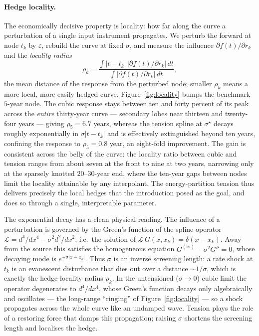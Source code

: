 \documentclass[]{interact}
\theoremstyle{plain}
\begin{document}
\paragraph{Hedge locality.} The economically decisive property is locality: how far along the
curve a perturbation of a single input instrument propagates. We perturb the forward at node
$t_k$ by $\varepsilon$, rebuild the curve at fixed $\sigma$, and measure the influence
$\partial f(t)/\partial r_k$ and the \emph{locality radius}
\begin{equation}
\rho_k=\frac{\int |t-t_k|\,\big|\partial f(t)/\partial r_k\big|\,dt}
{\int \big|\partial f(t)/\partial r_k\big|\,dt},
\label{eq:rho}
\end{equation}
the mean distance of the response from the perturbed node; smaller $\rho_k$ means a more local,
more easily hedged curve. Figure~\ref{fig:locality} bumps the benchmark $5$-year node. The
cubic response stays between ten and forty percent of its peak across the \emph{entire}
thirty-year curve --- secondary lobes near thirteen and twenty-four years --- giving
$\rho_5=6.7$ years, whereas the tension spline at $\sigma^\star$ decays roughly exponentially in
$\sigma|t-t_k|$ and is effectively extinguished beyond ten years, confining the response to
$\rho_5=0.8$ year, an eight-fold improvement. The gain is consistent across the belly of the
curve: the locality ratio between cubic and tension ranges from about seven at the front to
nine at two years, narrowing only at the sparsely knotted $20$--$30$-year end, where the
ten-year gaps between nodes limit the locality attainable by any interpolant. The
energy-partition tension thus delivers precisely the local hedges that the introduction posed
as the goal, and does so through a single, interpretable parameter.

The exponential decay has a clean physical reading. The influence of a perturbation is governed
by the Green's function of the spline operator $\mathcal{L}=d^4/dx^4-\sigma^2 d^2/dx^2$, i.e.\ the
solution of $\mathcal{L}\,G(x,x_k)=\delta(x-x_k)$. Away from the source this satisfies the
homogeneous equation $G^{(\mathrm{iv})}-\sigma^2 G''=0$, whose decaying mode is $e^{-\sigma|x-x_k|}$.
Thus $\sigma$ is an inverse screening length: a rate shock at $t_k$ is an evanescent disturbance
that dies out over a distance $\sim1/\sigma$, which is exactly the hedge-locality radius
$\rho_k$. In the untensioned ($\sigma\to0$) cubic limit the operator degenerates to
$d^4/dx^4$, whose Green's function decays only algebraically and oscillates --- the long-range
``ringing'' of Figure~\ref{fig:locality} --- so a shock propagates across the whole curve like an
undamped wave. Tension plays the role of a restoring force that damps this propagation; raising
$\sigma$ shortens the screening length and localises the hedge.
\end{document}
